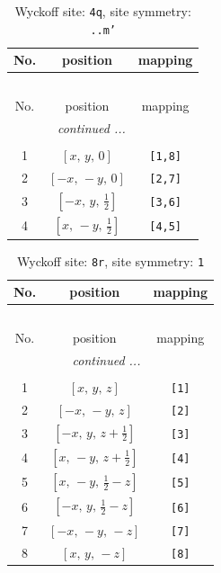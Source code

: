 \documentclass[fleqn,8pt]{jsarticle}
\begin{document}
\renewcommand{\arraystretch}{1.2}
\begin{longtable}{ccc}
\caption{Wyckoff site: {\tt 4q}, site symmetry: {\tt ..m'}}
 \\
 \hline \hline
No. & position & mapping \\ \hline \endfirsthead

\multicolumn{2}{l}{\tablename\ \thetable{}} \\
 \hline \hline
No. & position & mapping \\ \hline \endhead

 \hline \hline
\multicolumn{2}{r}{\footnotesize\it continued ...} \\ \endfoot

 \hline \hline
\multicolumn{2}{r}{} \\ \endlastfoot

1 & $\left[ x,\, y,\, 0 \right]$ & {\tt [1,8]} \\ \hline
2 & $\left[ - x,\, - y,\, 0 \right]$ & {\tt [2,7]} \\ \hline
3 & $\left[ - x,\, y,\, \frac{1}{2} \right]$ & {\tt [3,6]} \\ \hline
4 & $\left[ x,\, - y,\, \frac{1}{2} \right]$ & {\tt [4,5]} \\
\end{longtable}
\renewcommand{\arraystretch}{1.2}
\begin{longtable}{ccc}
\caption{Wyckoff site: {\tt 8r}, site symmetry: {\tt 1}}
 \\
 \hline \hline
No. & position & mapping \\ \hline \endfirsthead

\multicolumn{2}{l}{\tablename\ \thetable{}} \\
 \hline \hline
No. & position & mapping \\ \hline \endhead

 \hline \hline
\multicolumn{2}{r}{\footnotesize\it continued ...} \\ \endfoot

 \hline \hline
\multicolumn{2}{r}{} \\ \endlastfoot

1 & $\left[ x,\, y,\, z \right]$ & {\tt [1]} \\ \hline
2 & $\left[ - x,\, - y,\, z \right]$ & {\tt [2]} \\ \hline
3 & $\left[ - x,\, y,\, z + \frac{1}{2} \right]$ & {\tt [3]} \\ \hline
4 & $\left[ x,\, - y,\, z + \frac{1}{2} \right]$ & {\tt [4]} \\ \hline
5 & $\left[ x,\, - y,\, \frac{1}{2} - z \right]$ & {\tt [5]} \\ \hline
6 & $\left[ - x,\, y,\, \frac{1}{2} - z \right]$ & {\tt [6]} \\ \hline
7 & $\left[ - x,\, - y,\, - z \right]$ & {\tt [7]} \\ \hline
8 & $\left[ x,\, y,\, - z \right]$ & {\tt [8]} \\
\end{longtable}
\end{document}
